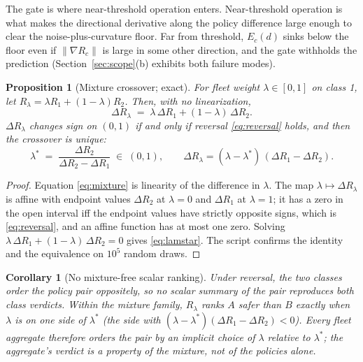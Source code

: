 \documentclass[11pt]{article}
\newtheorem{proposition}{Proposition}
\newtheorem{corollary}{Corollary}
\theoremstyle{definition}
\theoremstyle{remark}
\newcommand{\lamstar}{\lambda^{*}}
\begin{document}
The gate is where near-threshold operation enters. Near-threshold operation
is what makes the directional derivative along the policy difference large
enough to clear the noise-plus-curvature floor. Far from threshold, $E_c(d)$
sinks below the floor even if $\|\nabla R_c\|$ is large in some other
direction, and the gate withholds the prediction
(Section~\ref{sec:scope}(b) exhibits both failure modes).

\begin{proposition}[Mixture crossover; exact]\label{prop:mixture}
For fleet weight $\lambda \in [0,1]$ on class 1, let
$R_\lambda = \lambda R_1 + (1-\lambda) R_2$. Then, with no linearization,
\begin{equation}\label{eq:mixture}
\Delta R_\lambda \;=\; \lambda\,\Delta R_1 + (1-\lambda)\,\Delta R_2 .
\end{equation}
$\Delta R_\lambda$ changes sign on $(0,1)$ if and only if reversal
\eqref{eq:reversal} holds, and then the crossover is unique:
\begin{equation}\label{eq:lamstar}
\lamstar \;=\; \frac{\Delta R_2}{\Delta R_2 - \Delta R_1} \;\in\; (0,1),
\qquad
\Delta R_\lambda = (\lambda - \lamstar)\,(\Delta R_1 - \Delta R_2).
\end{equation}
\end{proposition}

\begin{proof}
Equation \eqref{eq:mixture} is linearity of the difference in $\lambda$.
The map $\lambda \mapsto \Delta R_\lambda$ is affine with endpoint values
$\Delta R_2$ at $\lambda = 0$ and $\Delta R_1$ at $\lambda = 1$; it has a
zero in the open interval iff the endpoint values have strictly opposite
signs, which is \eqref{eq:reversal}, and an affine function has at most one
zero. Solving $\lambda\,\Delta R_1 + (1-\lambda)\,\Delta R_2 = 0$ gives
\eqref{eq:lamstar}. The script confirms the identity and the equivalence on
$10^5$ random draws.
\end{proof}

\begin{corollary}[No mixture-free scalar ranking]\label{cor:scalar}
Under reversal, the two classes order the policy pair oppositely, so no
scalar summary of the pair reproduces both class verdicts. Within the
mixture family, $R_\lambda$ ranks $A$ safer than $B$ exactly when $\lambda$
is on one side of $\lamstar$ (the side with
$(\lambda-\lamstar)(\Delta R_1 - \Delta R_2) < 0$). Every fleet aggregate
therefore orders the pair by an implicit choice of $\lambda$ relative to
$\lamstar$; the aggregate's verdict is a property of the mixture, not of the
policies alone.
\end{corollary}
\end{document}

